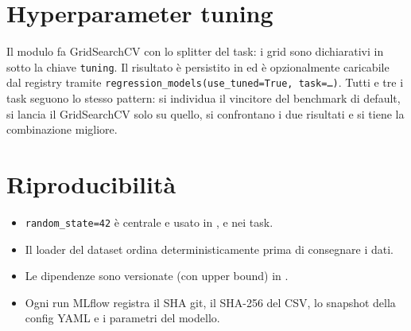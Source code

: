 \section{Hyperparameter tuning}

Il modulo  fa GridSearchCV con lo splitter
del task: i grid sono dichiarativi in  sotto
la chiave \texttt{tuning}. Il risultato è persistito in
 ed è opzionalmente caricabile
dal registry tramite \texttt{regression\_models(use\_tuned=True,
task=\dots)}. Tutti e tre i task seguono lo stesso pattern: si individua
il vincitore del benchmark di default, si lancia il GridSearchCV solo su
quello, si confrontano i due risultati e si tiene la combinazione
migliore.

\section{Riproducibilità}

\begin{itemize}
  \item \texttt{random\_state=42} è centrale e usato in
        ,  e nei task.
  \item Il loader del dataset ordina deterministicamente prima di
        consegnare i dati.
  \item Le dipendenze sono versionate (con upper bound) in
        .
  \item Ogni run MLflow registra il SHA git, il SHA-256 del CSV, lo
        snapshot della config YAML e i parametri del modello.
\end{itemize}
